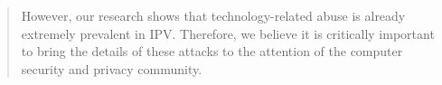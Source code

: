 \begin{quote}
	However, our research shows that technology-related abuse is already extremely prevalent in IPV. Therefore, we believe it is critically important to bring the details of these attacks to the attention of the computer security and privacy community.
\end{quote}









\label{subsec:D}
